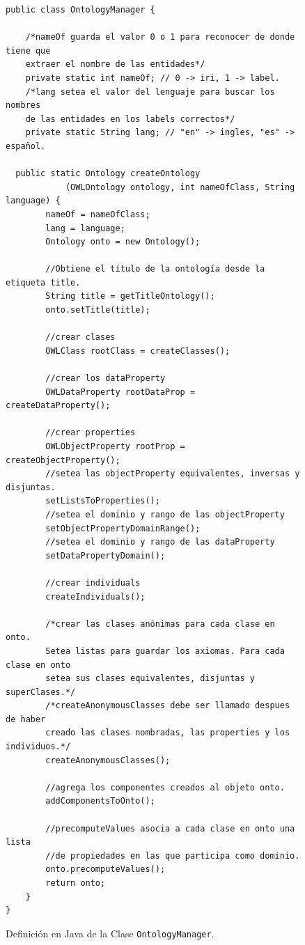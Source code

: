\begin{figure}
\begin{verbatim}
public class OntologyManager {

    /*nameOf guarda el valor 0 o 1 para reconocer de donde tiene que
    extraer el nombre de las entidades*/
    private static int nameOf; // 0 -> iri, 1 -> label.
    /*lang setea el valor del lenguaje para buscar los nombres
    de las entidades en los labels correctos*/
    private static String lang; // "en" -> ingles, "es" -> español.

  public static Ontology createOntology
            (OWLOntology ontology, int nameOfClass, String language) {
        nameOf = nameOfClass;
        lang = language;
        Ontology onto = new Ontology();
        
        //Obtiene el título de la ontología desde la etiqueta title.
        String title = getTitleOntology();
        onto.setTitle(title);
        
        //crear clases
        OWLClass rootClass = createClasses();

        //crear los dataProperty
        OWLDataProperty rootDataProp = createDataProperty();
        
        //crear properties
        OWLObjectProperty rootProp = createObjectProperty();
        //setea las objectProperty equivalentes, inversas y disjuntas.
        setListsToProperties();
        //setea el dominio y rango de las objectProperty
        setObjectPropertyDomainRange();
        //setea el dominio y rango de las dataProperty
        setDataPropertyDomain();
        
        //crear individuals
        createIndividuals();
        
        /*crear las clases anónimas para cada clase en onto.
        Setea listas para guardar los axiomas. Para cada clase en onto
        setea sus clases equivalentes, disjuntas y superClases.*/
        /*createAnonymousClasses debe ser llamado despues de haber
        creado las clases nombradas, las properties y los individuos.*/
        createAnonymousClasses();
        
        //agrega los componentes creados al objeto onto.
        addComponentsToOnto();
        
        //precomputeValues asocia a cada clase en onto una lista 
        //de propiedades en las que participa como dominio.
        onto.precomputeValues();
        return onto;
    }
}
\end{verbatim}
\caption{Definición en Java de la Clase \texttt{OntologyManager}.}
\label{fig:clase_ontologymanager}
\end{figure}


